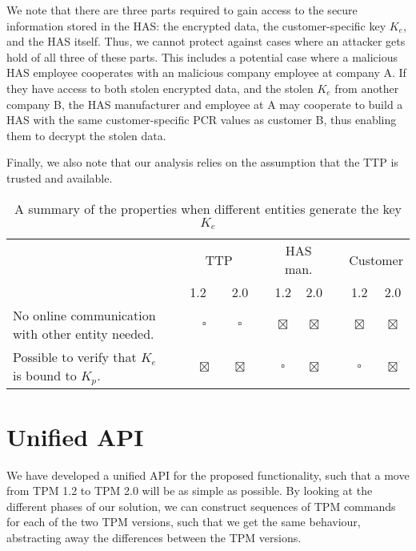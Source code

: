 {We note that there are three parts required to gain access to the secure information stored in the HAS: the encrypted data, the customer-specific key $K_e$, and the HAS itself. Thus, we cannot protect against cases where an attacker gets hold of all three of these parts. This includes a potential case where a malicious HAS employee cooperates with an malicious company employee at company A. If they have access to both stolen encrypted data, and the stolen $K_e$ from another company B, the HAS manufacturer and employee at A may cooperate to build a HAS with the same customer-specific PCR values as customer B, thus enabling them to decrypt the stolen data.

Finally, we also note that our analysis relies on the assumption that the TTP is trusted and available.

\newcommand{\ayemark}{$\boxtimes$}
\newcommand{\nopemark}{$\square$}

\begin{table}[hbtp]
	\begin{center}
		\caption{A summary of the properties when different entities generate the key $K_e$}
		\label{tbl:kesecanalysis}
		\begin{tabular}{m{3.65cm}l cc l cc l cc}
			\toprule
			& \phantom{w} & \multicolumn{2}{c}{TTP} & \phantom{w} & \multicolumn{2}{c}{HAS man.} & \phantom{w} & \multicolumn{2}{c}{Customer} \\
			\cmidrule{3-4} \cmidrule{6-7} \cmidrule{9-10}
			&& 1.2~~ & 2.0 & & 1.2 & 2.0 & & 1.2 & 2.0 \\
			\midrule
			{\small No online communication with other entity needed.}& & \nopemark & \nopemark && \ayemark & \ayemark && \ayemark & \ayemark \\
			\midrule
			{\small Possible to verify that $K_e$ is bound to $K_p$.}& & \ayemark & \ayemark && \nopemark & \ayemark && \nopemark & \ayemark \\
			\bottomrule
		\end{tabular}
	\end{center}
\end{table}

\section{Unified API} \label{sec:unifiedapi}

We have developed a unified API for the proposed functionality, such that a move from TPM 1.2 to TPM 2.0 will be as simple as possible.
By looking at the different phases of our solution, we can construct sequences of TPM commands for each of the two TPM versions, such that we get the same behaviour, abstracting away the differences between the TPM versions.

}
